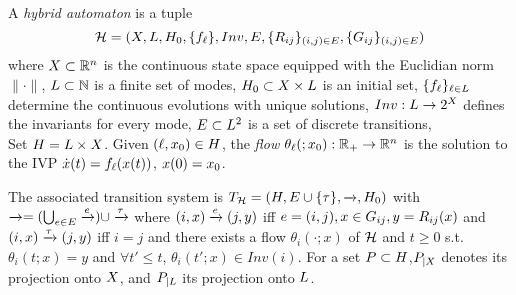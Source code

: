\begin{defn}
	\label{defn:hybrid system}	
	A \emph{hybrid automaton} is a tuple \[\mathcal{H} = (X,L,H_0,\{f_\ell\}, Inv,E, \{R_{ij}\}_{(i,j)\in E}, \{G_{ij}\}_{(i,j)\in E})\] where 
		 $X \subset \mathbb{R}^n$ is the continuous state space equipped with the Euclidian norm $\|\cdot\|$, 
		$L \subset \mathbb{N}$ is a finite set of modes,
		 $H_0 \subset X \times L$ is an initial set,
		 $\{f_\ell\}_{\ell \in L}$ determine the continuous evolutions with unique solutions,
		 $Inv: L \rightarrow 2^X$ defines the invariants for every mode,
		 $E \subset L^2$ is a set of discrete transitions,
		 \\
		 Set $H = L\times X$.
		 Given $(\ell,x_0) \in H$, the \emph{flow} $\theta_{\ell}(;x_0):\mathbb{R}_+ \rightarrow \mathbb{R}^n$ is the solution to the IVP $\dot{x}(t) = f_\ell (x(t))$, $x(0)=x_0$.
\end{defn}
%
The associated transition system is $T_{\mathcal{H}} = (H,  E \cup \{\tau\},\xrightarrow{},H_0)$ 
with $\xrightarrow{} = (\bigcup_{e \in E} \xrightarrow{e}) \cup \xrightarrow{\tau}$ 
where $(i,x) \xrightarrow{e} (j,y)$ iff $e = (i,j), x \in G_{ij}, y = R_{ij}(x)$ and $(i,x) \xrightarrow{\tau} (j,y)$ iff $i = j$ and there exists 
a flow $\theta_i(\cdot;x)$ of $\mathcal{H}$ and $t\geq 0$ s.t. $\theta_i(t;x)=y$ and $\forall t' \leq t$, $\theta_i(t';x) \in Inv(i)$.
For a set $P \subset H$,$P_{|X}$ denotes its projection onto $X$, 
and $P_{|L}$ its projection onto $L$. 
